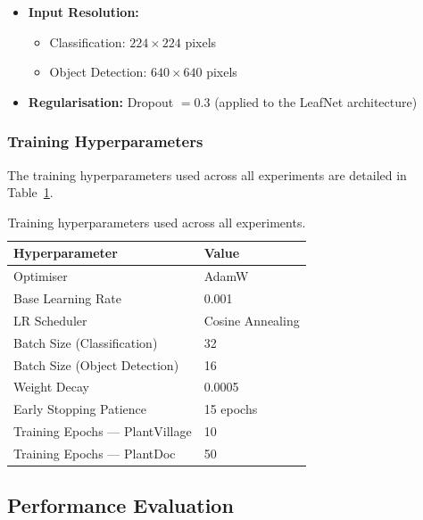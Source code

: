 \documentclass[10pt, conference]{IEEEtran}
\begin{document}
\begin{itemize}
    \item \textbf{Input Resolution:}
    \begin{itemize}
        \item Classification: $224 \times 224$ pixels
        \item Object Detection: $640 \times 640$ pixels
    \end{itemize}
    \item \textbf{Regularisation:} Dropout $= 0.3$ (applied to the LeafNet
          architecture)
\end{itemize}

\subsubsection{Training Hyperparameters}

The training hyperparameters used across all experiments are detailed in Table~\ref{tab:hyperparams}.

\begin{table}[!t]
    \centering
    \caption{Training hyperparameters used across all experiments.}
    \label{tab:hyperparams}
    \begin{tabular}{ll}
        \toprule
        \textbf{Hyperparameter}   & \textbf{Value} \\
        \midrule
        Optimiser                 & AdamW \\
        Base Learning Rate        & 0.001 \\
        LR Scheduler              & Cosine Annealing \\
        Batch Size (Classification)  & 32 \\
        Batch Size (Object Detection) & 16 \\
        Weight Decay              & 0.0005 \\
        Early Stopping Patience   & 15 epochs \\
        \midrule
        Training Epochs — PlantVillage & 10 \\
        Training Epochs — PlantDoc     & 50 \\
        \bottomrule
    \end{tabular}
\end{table}

\subsection{Performance Evaluation}
\label{subsec:results}
\end{document}
